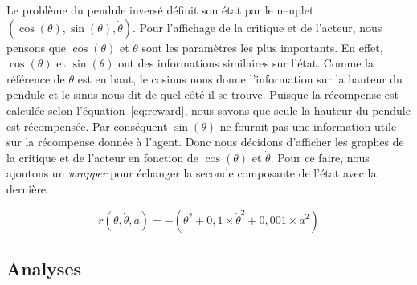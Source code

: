 Le problème du pendule inversé définit son état par le n--uplet $ (\cos(\theta),
\sin(\theta), \dot{\theta}) $. Pour l'affichage de la critique et de l'acteur,
nous pensons que $ \cos(\theta) $ et $ \dot{\theta} $ sont les paramètres les
plus importants. En effet, $ \cos(\theta) $ et $ \sin(\theta) $ ont des
informations similaires sur l'état. Comme la référence de $ \theta $ est en
haut, le cosinus nous donne l'information sur la hauteur du pendule et le sinus
nous dit de quel côté il se trouve. Puisque la récompense est calculée selon
l'équation~\eqref{eq:reward}, nous savons que seule la hauteur du pendule est
récompensée. Par conséquent $ \sin(\theta) $ ne fournit pas une information
utile sur la récompense donnée à l'agent. Donc nous décidons d'afficher les
graphes de la critique et de l'acteur en fonction de $ \cos(\theta) $ et $
\dot{\theta} $. Pour ce faire, nous ajoutons un \emph{wrapper} pour échanger la
seconde composante de l'état avec la dernière.

\begin{equation}
    r(\theta, \dot{\theta}, a)= -(\theta^{2} + 0,1 \times \dot{\theta}^{2} + 0,001 \times a^{2})
    \label{eq:reward}
\end{equation}
 
\subsection{Analyses}
    
